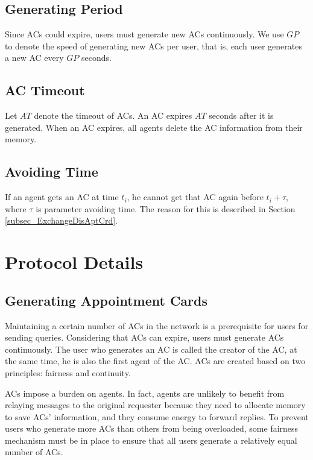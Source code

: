 \documentclass[conference]{IEEEtran}
\begin{document}
\subsection{ Generating Period}

\noindent Since ACs could expire, users must generate new ACs continuously. We use $GP$ to denote the speed of generating new ACs per user, that is, each user generates a new AC every $GP$ seconds.


\subsection{ AC Timeout}

\noindent Let $AT$ denote the timeout of ACs. An AC expires $AT$ seconds after it is generated. When an AC expires, all agents delete the AC information from their memory.


\subsection{ Avoiding Time}

\noindent If an agent gets an AC at time $t_i$, he cannot get that AC again before $t_i+\tau $, where $\tau$ is parameter avoiding time. The reason for this is described in Section \ref{subsec_ExchangeDisAptCrd}.


\section{ Protocol Details}


\subsection{ Generating Appointment Cards}

\noindent Maintaining a certain number of ACs in the network is a prerequisite for users for sending queries. Considering that ACs can expire, users must generate ACs continuously. The user who generates an AC is called the creator of the AC, at the same time, he is also the first agent of the AC. ACs are created based on two principles: fairness and continuity. 

ACs impose a burden on agents. In fact, agents are unlikely to benefit from relaying messages to the original requester because they need to allocate memory to save ACs' information, and they consume energy to forward replies. To prevent users who generate more ACs than others from being overloaded, some fairness mechanism must be in place to ensure that all users generate a relatively equal number of ACs.
\end{document}
